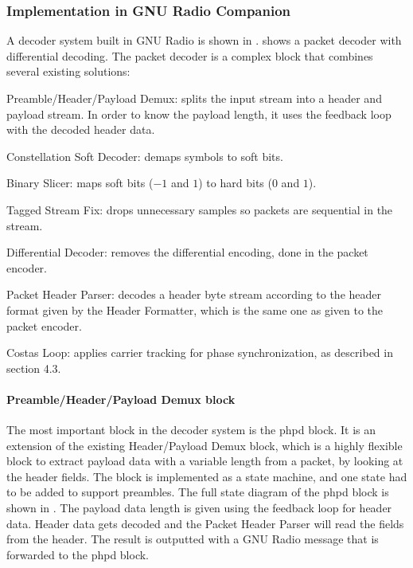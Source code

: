 \subsubsection{Implementation in GNU Radio Companion}
A decoder system built in GNU Radio is shown in .  shows a packet decoder with differential decoding. The packet decoder is a complex block that combines several existing solutions:
\begin{tight_itemize}
\item Preamble/Header/Payload Demux: splits the input stream into a header and payload stream. In order to know the payload length, it uses the feedback loop with the decoded header data.
\item Constellation Soft Decoder: demaps symbols to soft bits.
\item Binary Slicer: maps soft bits ($-1$ and $1$) to hard bits ($0$ and $1$).
\item Tagged Stream Fix: drops unnecessary samples so packets are sequential in the stream.
\item Differential Decoder: removes the differential encoding, done in the packet encoder.
\item Packet Header Parser: decodes a header byte stream according to the header format given by the Header Formatter, which is the same one as given to the packet encoder.
\item Costas Loop: applies carrier tracking for phase synchronization, as described in section 4.3.
\end{tight_itemize}



\paragraph*{Preamble/Header/Payload Demux block}
The most important block in the decoder system is the \gls{phpd} block.
It is an extension of the existing Header/Payload Demux block, which is a highly flexible block to extract payload data with a variable length from a packet, by looking at the header fields. The block is implemented as a state machine, and one state had to be added to support preambles. The full state diagram of the \gls{phpd} block is shown in . The payload data length is given using the feedback loop for header data. Header data gets decoded and the Packet Header Parser will read the fields from the header. The result is outputted with a GNU Radio message that is forwarded to the \gls{phpd} block.\medskip 

